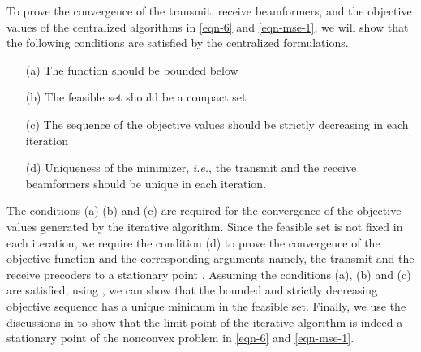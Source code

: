 To prove the convergence of the transmit, receive beamformers, and the objective values of the centralized algorithms in \eqref{eqn-6} and \eqref{eqn-mse-1}, we will show that the following conditions are satisfied by the centralized formulations.
\begin{itemize}
	\item[(a)] The function should be bounded below
	\item[(b)] The feasible set should be a compact set
	\item[(c)] The sequence of the objective values should be strictly decreasing in each iteration
	\item[(d)] Uniqueness of the minimizer, \textit{i.e.}, the transmit and the receive beamformers should be unique in each iteration.
\end{itemize}
The conditions (a) (b) and (c) are required for the convergence of the objective values generated by the iterative algorithm. Since the feasible set is not fixed in each iteration, we require the condition (d) to prove the convergence of the objective function and the corresponding arguments namely, the transmit and the receive precoders to a stationary point \cite{meyer1976sufficient}. Assuming the conditions (a), (b) and (c) are satisfied, using \cite[Th. 3.14]{rudin1964principles}, we can show that the bounded and strictly decreasing objective sequence has a unique minimum in the feasible set. Finally, we use the discussions in \cite{marks1978technical,lanckriet2009convergence,scutari_1} to show that the limit point of the iterative algorithm is indeed a stationary point of the nonconvex problem in \eqref{eqn-6} and \eqref{eqn-mse-1}.

